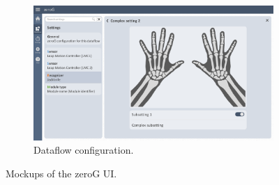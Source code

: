 \begin{figure}[htp]
  \begin{subfigure}{\textwidth}
      \centering
      \includegraphics[width=.79\linewidth]{Figures/Conclusion/zeroG-3.pdf}  
      \vspace{-4pt}
      \captionsetup{width=.9\linewidth}
      \caption{Dataflow configuration.}
      \label{fig:zerog:ui:3}
  \end{subfigure}

  \vspace{-6pt}
  \caption{Mockups of the zeroG UI.}
  \label{fig:zerog:ui}
\end{figure}

